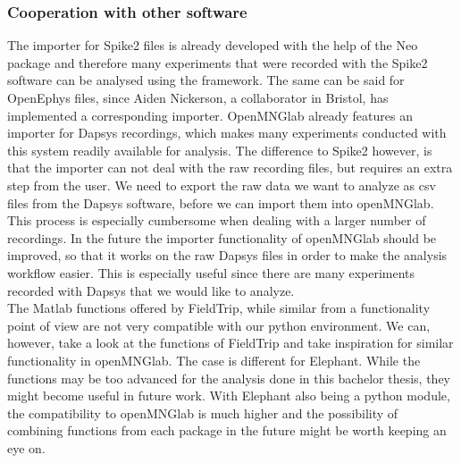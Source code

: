 \subsubsection{Cooperation with other software}
The importer for Spike2 files is already developed with the help of the Neo package and therefore many experiments that were recorded with the Spike2 software can be analysed using the framework. The same can be said for OpenEphys files, since Aiden Nickerson, a collaborator in Bristol, has implemented a corresponding importer.
OpenMNGlab already features an importer for Dapsys recordings, which makes many experiments conducted with this system readily available for analysis.
The difference to Spike2 however, is that the importer can not deal with the raw recording files, but requires an extra step from the user. We need to export the raw data we want to analyze as csv files from the Dapsys software, before we can import them into openMNGlab. This process is especially cumbersome when dealing with a larger number of recordings. In the future the importer functionality of openMNGlab should be improved, so that it works on the raw Dapsys files in order to make the analysis workflow easier. This is especially useful since there are many experiments recorded with Dapsys that we would like to analyze.\\

The Matlab functions offered by FieldTrip, while similar from a functionality point of view are not very compatible with our python environment. We can, however, take a look at the functions of FieldTrip and take inspiration for similar functionality in openMNGlab.
The case is different for Elephant. While the functions may be too advanced for the analysis done in this bachelor thesis, they might become useful in future work.  With Elephant also being a python module, the compatibility to openMNGlab is much higher and the possibility of combining functions from each package in the future might be worth keeping an eye on. 

